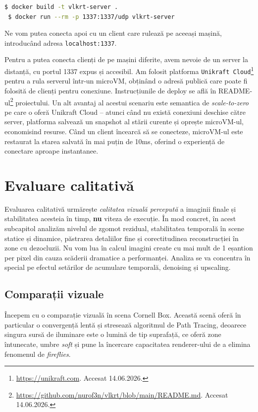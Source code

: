 \documentclass[12pt,a4paper]{report}
\numberwithin{equation}{section} %
\begin{document}
\begin{lstlisting}[language=bash]
 $ docker build -t vlkrt-server .
 $ docker run --rm -p 1337:1337/udp vlkrt-server 
\end{lstlisting}

Ne vom putea conecta apoi cu un client care rulează pe aceeași mașină, introducând adresa \texttt{localhost:1337}.

Pentru a putea conecta clienți de pe mașini diferite, avem nevoie de un server la distanță, cu portul 1337 expus și accesibil.
Am folosit platforma \texttt{Unikraft Cloud}\footnote{\label{ftn:unikraft}\url{https://unikraft.com}. Accesat 14.06.2026.} pentru a rula serverul într-un microVM, obținând o adresă publică care poate fi folosită de clienți pentru conexiune.
Instrucțiunile de deploy se află în README-ul\footnote{\url{https://github.com/nurof3n/vlkrt/blob/main/README.md}. Accesat 14.06.2026.} proiectului.
Un alt avantaj al acestui scenariu este semantica de \textit{scale-to-zero} pe care o oferă Unikraft Cloud -- atunci când nu există conexiuni deschise către server, platforma salvează un snapshot al stării curente și oprește microVM-ul, economisind resurse.
Când un client încearcă să se conecteze, microVM-ul este restaurat la starea salvată în mai puțin de 10ms, oferind o experiență de conectare aproape instantanee.

\section{\label{sec:evaluare_calitativa}Evaluare calitativă}

Evaluarea calitativă urmărește \textit{calitatea vizuală percepută} a imaginii finale și stabilitatea acesteia în timp, \textbf{nu} viteza de execuție.
În mod concret, în acest subcapitol analizăm nivelul de zgomot rezidual, stabilitatea temporală în scene statice și dinamice, păstrarea detaliilor fine și corectitudinea reconstrucției în zone cu dezocluzii.
Nu vom lua în calcul imagini create cu mai mult de 1 eșantion per pixel din cauza scăderii dramatice a performanței.
Analiza se va concentra în special pe efectul setărilor de acumulare temporală, denoising și upscaling.

\subsection{Comparații vizuale}

Începem cu o comparație vizuală în scena Cornell Box.
Această scenă oferă în particular o convergență lentă și stresează algoritmul de Path Tracing, deoarece singura sursă de iluminare este o lumină de tip suprafață, ce oferă zone întunecate, umbre \textit{soft} și pune la încercare capacitatea renderer-ului de a elimina fenomenul de \textit{fireflies}.
\end{document}
